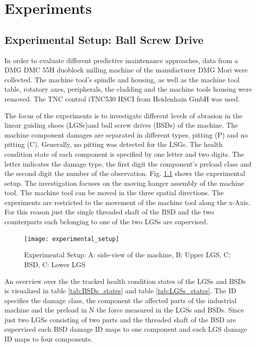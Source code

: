 \chapter{Experiments}\label{chapter:experiments}




\section{Experimental Setup: Ball Screw Drive}
In order to evaluate different predictive maintenance approaches, data from a DMG DMC 55H duoblock milling machine of the manufacturer DMG Mori were collected. The machine tool’s spindle and housing, as well as the machine tool table, rotatory axes, peripherals, the cladding and the machine tools housing were removed. The TNC control iTNC530 HSCI from Heidenhain GmbH was used.

The focus of the experiments is to investigate different levels of abrasion in the linear guiding shoes (LGSs)and ball screw drives (BSDs) of the machine. The machine component damages are separated in different types, pitting (P) and no pitting (C). Generally, no pitting was detected for the LSGs. The health condition state of each component is specified by one letter and two digits. The letter indicates the damage type, the first digit the component’s preload class and the second digit the number of the observation. Fig. \ref{fig:experimental_setup} shows the experimental setup. The investigation focuses on the moving hanger assembly of the machine tool. The machine tool can be moved in the three spatial directions. The experiments are restricted to the movement of the machine tool along the x-Axis. For this reason just the single threaded shaft of the BSD and the two counterparts each belonging to one of the two LGSs are supervised.

\begin{figure}[htpb]
  \centering
  \texttt{[image: experimental\_setup]}
  \caption {Experimental Setup: A: side-view of the machine, B: Upper LGS, C: BSD, C: Lower LGS}
  \label{fig:experimental_setup}
\end{figure}



An overview over the the tracked health condition states of the LGSs and BSDs is visualized in table \ref {tab:BSDs_states} and table \ref {tab:LGSs_states}. The ID specifies the damage class, the component the affected parts of the industrial machine and the preload in N the force measured in the LGSs and BSDs. Since just two LGSs consisting of two parts and the threaded shaft of the BSD are supervised each BSD damage ID maps to one component and each LGS damage ID maps to four components. 


